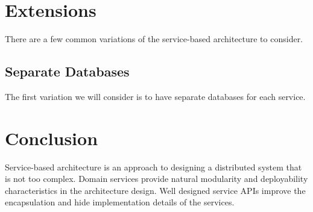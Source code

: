 \section{Extensions}

There are a few common variations of the service-based architecture to consider.

\subsection{Separate Databases}

The first variation  we will consider is to have separate databases for each service.


\section{Conclusion}

Service-based architecture is an approach to designing a distributed system that is not too complex.
Domain services provide natural modularity and deployability characteristics in the architecture design.
Well designed service APIs improve the encapsulation and hide implementation details of the services.
